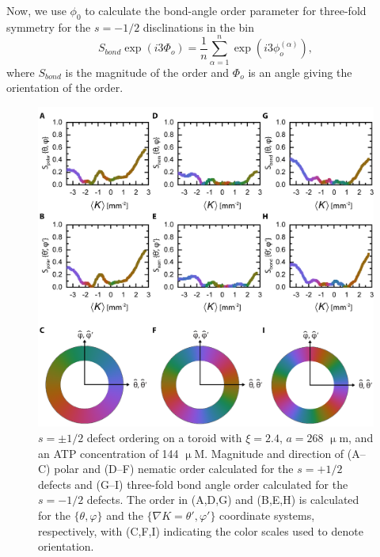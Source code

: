 Now, we use $\phi_0$ to calculate the bond-angle order parameter for three-fold symmetry for the $s = -1/2$ disclinations in the bin
\begin{equation}\label{e:7-hexorder}
  S_{bond} \exp(i 3 \Phi_o) = \frac{1}{n}\sum\limits_{\alpha = 1}^n \exp (i 3 \phi_o^{(\alpha)}),
\end{equation}
where $S_{bond}$ is the magnitude of the order and $\Phi_o$ is an angle giving the orientation of the order.
\begin{figure}
  \centering
  \includegraphics{figures/C7/Ch7-Figs_Orient_MeanK.png}
  \caption{$s = \pm 1/2$ defect ordering on a toroid with $\xi = 2.4$, $a = 268$ $\upmu$m, and an ATP concentration of 144 $\upmu$M.
  Magnitude and direction of (A--C) polar and (D--F) nematic order calculated for the $s = +1/2$ defects and (G--I) three-fold bond angle order calculated for the $s = -1/2$ defects.
  The order in (A,D,G) and (B,E,H) is calculated for the $\{\theta,\varphi \}$ and the $\{\nabla K = \theta',\varphi' \}$ coordinate systems, respectively, with (C,F,I) indicating the color scales used to denote orientation.
  }\label{f:7-Orient_MeanK}
\end{figure}


